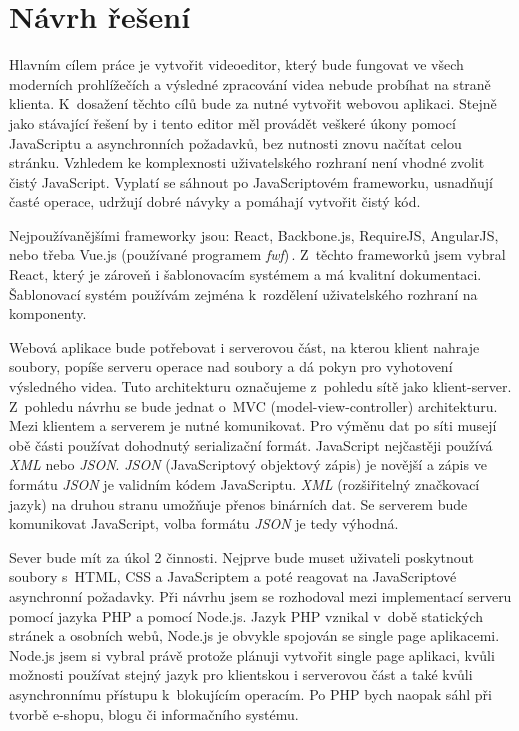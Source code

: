 \chapter{Návrh řešení}
Hlavním cílem práce je vytvořit videoeditor, který bude fungovat ve všech moderních prohlížečích a výsledné zpracování videa nebude probíhat na straně klienta. K~dosažení těchto cílů bude za nutné vytvořit webovou aplikaci. Stejně jako stávající řešení by i tento editor měl provádět veškeré úkony pomocí JavaScriptu a asynchronních požadavků, bez nutnosti znovu načítat celou stránku. Vzhledem ke komplexnosti uživatelského rozhraní není vhodné zvolit čistý JavaScript. Vyplatí se sáhnout po JavaScriptovém frameworku, usnadňují časté operace, udržují dobré návyky a pomáhají vytvořit čistý kód.

Nejpoužívanějšími frameworky jsou: React, Backbone.js, RequireJS, AngularJS, nebo třeba Vue.js (používané programem \textit{fwf})\,\cite{WappalyzerJavasript}. Z~těchto frameworků jsem vybral React, který je zároveň i šablonovacím systémem a má kvalitní dokumentaci. Šablonovací systém používám zejména k~rozdělení uživatelského rozhraní na komponenty.

Webová aplikace bude potřebovat i serverovou část, na kterou klient nahraje soubory, popíše serveru operace nad soubory a dá pokyn pro vyhotovení výsledného videa. Tuto architekturu označujeme z~pohledu sítě jako klient-server. Z~pohledu návrhu se bude jednat o~MVC (model-view-controller) architekturu. Mezi klientem a serverem je nutné komunikovat. Pro výměnu dat po síti musejí obě části používat dohodnutý serializační formát. JavaScript nejčastěji používá \textit{XML} nebo \textit{JSON}. \textit{JSON} (JavaScriptový objektový zápis) je novější a zápis ve formátu \textit{JSON} je validním kódem JavaScriptu. \textit{XML} (rozšiřitelný značkovací jazyk) na druhou stranu umožňuje přenos binárních dat. Se serverem bude komunikovat JavaScript, volba formátu \textit{JSON} je tedy výhodná.

Sever bude mít za úkol 2 činnosti. Nejprve bude muset uživateli poskytnout soubory s~HTML, CSS a JavaScriptem a poté reagovat na JavaScriptové asynchronní požadavky. Při návrhu jsem se rozhodoval mezi implementací serveru pomocí jazyka PHP a pomocí Node.js. Jazyk PHP vznikal v~době statických stránek a osobních webů, Node.js je obvykle spojován se single page aplikacemi. Node.js jsem si vybral právě protože plánuji vytvořit single page aplikaci, kvůli možnosti používat stejný jazyk pro klientskou i serverovou část a také kvůli asynchronnímu přístupu k~blokujícím operacím. Po PHP bych naopak sáhl při tvorbě e-shopu, blogu či informačního systému.

